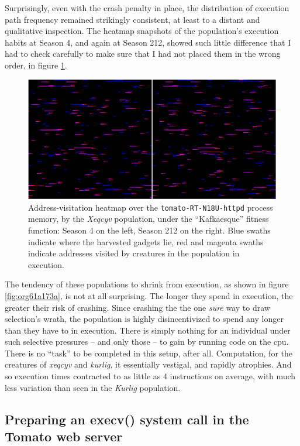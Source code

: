 \documentclass[12pt,glossary]{dalthesis}
\begin{document}
Surprisingly, even with the crash penalty in place, the distribution of execution
path frequency remained strikingly consistent, at least to a distant and qualitative
inspection. The heatmap snapshots of the population's execution habits at Season 4,
and again at Season 212, showed such little difference that I had to check carefully
to make sure that I had not placed them in the wrong order, in figure
\ref{fig:orgc6a5d72}. 

\begin{figure}[htbp]
\centering
\includegraphics[width=.9\linewidth]{../images/plots/xeqcyv_kafka_heatmap_beginning_end.pdf}
\caption{\label{fig:orgc6a5d72}
Address-visitation heatmap over the \texttt{tomato-RT-N18U-httpd} process memory, by the \emph{Xeqcyv} population, under the ``Kafkaesque'' fitness function: Season 4 on the left, Season 212 on the right. Blue swaths indicate where the harvested gadgets lie, red and magenta swaths indicate addresses visited by creatures in the population in execution.}
\end{figure}


The tendency of these populations to shrink from execution, as shown in figure
\ref{fig:org61a173a}, is not at all surprising. The longer they spend in
execution, the greater their risk of crashing. Since crashing the the one \emph{sure}
way to draw selection's wrath, the population is highly disincentivized to spend
any longer than they have to in execution. There is simply nothing for an
individual under such selective pressures -- and only those -- to gain by
running code on the \gls{cpu}. There is no ``task'' to be completed in this setup,
after all. Computation, for the creatures of \emph{xeqcyv} and \emph{kurlig}, it essentially
vestigal, and rapidly atrophies. And so execution times contracted to as little
as 4 instructions on average, with much less variation than seen in the
\emph{Kurlig} population.

\subsection{Preparing an execv() system call in the Tomato web server}
\label{sec:orgc2bff9a}
\label{org4957399}
\end{document}
